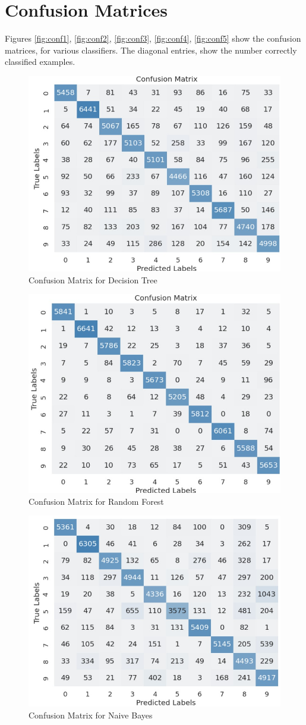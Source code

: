\section{Confusion Matrices}
Figures \autoref{fig:conf1}, \autoref{fig:conf2}, \autoref{fig:conf3}, \autoref{fig:conf4}, \autoref{fig:conf5} show the confusion matrices, for various classifiers. The diagonal entries, show the number correctly classified examples. 
\begin{figure}[H]
    \centering
    \includegraphics[width=0.6\linewidth]{images/DT_cm.jpg}
    \caption{Confusion Matrix for Decision Tree}
    \label{fig:conf1}
\end{figure}

\begin{figure}[H]
    \centering
    \includegraphics[width=0.6\linewidth]{images/RF_cm.jpg}
    \caption{Confusion Matrix for Random Forest}
    \label{fig:conf2}
    
\end{figure}

\begin{figure}[H]
    \centering
    \includegraphics[width=0.6\linewidth]{images/NB_cm.jpg}
    \caption{Confusion Matrix for Naive Bayes}
    \label{fig:conf3}
    
\end{figure}

